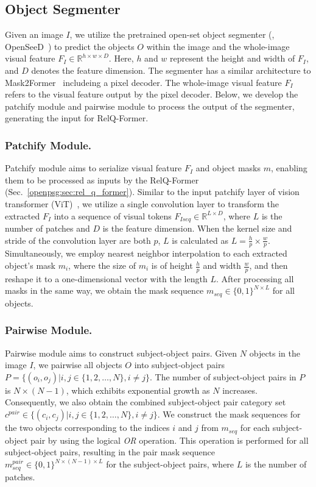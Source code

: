\subsection{Object Segmenter}
\label{openpsg:sec:object_segmenter}
Given an image $I$, we utilize the pretrained open-set object segmenter (\eg, OpenSeeD~\citep{zhang2023simple}) to predict the objects $O$ within the image and the whole-image visual feature $F_I \in \mathbb{R}^{h \times w \times D}$. 
Here, $h$ and $w$ represent the height and width of $F_I$, and $D$ denotes the feature dimension.
The segmenter has a similar architecture to Mask2Former~\citep{cheng2022masked} includeing a pixel decoder.
The whole-image visual feature $F_I$ refers to the visual feature output by the pixel decoder.
Below, we develop the patchify module and pairwise module to process the output of the segmenter, generating the input for RelQ-Former. 

\subsubsection{Patchify Module.}
Patchify module aims to serialize visual feature $F_I$ and object masks $m$, enabling them to be processed as inputs by the RelQ-Former (Sec.~\ref{openpsg:sec:rel_q_former}).
Similar to the input patchify layer of vision transformer (ViT)~\citep{dosovitskiy2020image}, we utilize a single convolution layer to transform the extracted $F_I$ into a sequence of visual tokens $F_{Iseq} \in \mathbb{R}^{L \times D}$, where $L$ is the number of patches and $D$ is the feature dimension.
When the kernel size and stride of the convolution layer are both $p$, $L$ is calculated as $L = \frac{h}{p} \times \frac{w}{p}$.
Simultaneously, we employ nearest neighbor interpolation to each extracted object's mask $m_i$, where the size of $m_i$ is of height $\frac{h}{p}$ and width $\frac{w}{p}$, and then reshape it to a one-dimensional vector with the length $L$.
After processing all masks in the same way, we obtain the mask sequence $m_{seq} \in \{0, 1\}^{N \times L}$ for all objects.

\subsubsection{Pairwise Module.}
Pairwise module aims to construct subject-object pairs.
Given $N$ objects in the image $I$, we pairwise all objects $O$ into subject-object pairs $P = \{(o_i, o_j) | i, j \in \{1, 2, \ldots, N\}, i \neq j\}$.
The number of subject-object pairs in $P$ is $N \times (N - 1)$, which exhibits exponential growth as $N$ increases.
Consequently, we also obtain the combined subject-object pair category set $c^{pair} \in \{(c_i, c_j) | i, j \in \{1, 2, \ldots, N\}, i \neq j\}$.
We construct the mask sequences for the two objects corresponding to the indices $i$ and $j$ from $m_{seq}$ for each subject-object pair by using the logical \emph{OR} operation.
This operation is performed for all subject-object pairs, resulting in the pair mask sequence $m_{seq}^{pair} \in \{0, 1\}^{N \times (N-1) \times L}$ for the subject-object pairs, where $L$ is the number of patches.

